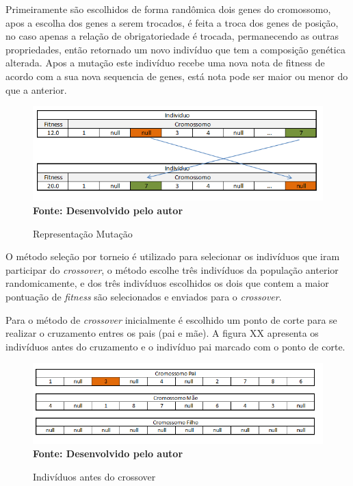 Primeiramente são escolhidos de forma randômica dois genes do cromossomo, apos a escolha dos genes a serem trocados, é feita a troca dos genes de posição, no caso apenas a relação de obrigatoriedade é trocada, permanecendo as outras propriedades, então retornado um novo indivíduo que tem a composição genética alterada. Apos a mutação este indivíduo recebe uma nova nota de fitness de acordo com a sua nova sequencia de genes, está nota pode ser maior ou menor do que a anterior.\par

\begin{figure}[!htb]
\caption[Representação Mutação]{Representação Mutação}
\label{fig:figura8}
\centering
\includegraphics[scale=0.7]{imagens/representacaoMutacao.png}
\\ \textbf{\footnotesize Fonte: Desenvolvido pelo autor}
\end{figure}

O método seleção por torneio é utilizado para selecionar os indivíduos que iram participar do \textit{crossover}, o método escolhe três indivíduos da população anterior randomicamente, e dos três indivíduos escolhidos os dois que contem a maior pontuação de \textit{fitness} são selecionados e enviados para o \textit{crossover}.\par

Para o método de \textit{crossover} inicialmente é escolhido um ponto de corte para se realizar o cruzamento entres os pais (pai e mãe). A figura XX apresenta os indivíduos antes do cruzamento e o indivíduo pai marcado com o ponto de corte.\par

\begin{figure}[!htb]
\caption[Indivíduos antes do crossover]{Indivíduos antes do crossover}
\label{fig:figura8}
\centering
\includegraphics[scale=0.7]{imagens/individuosAntesInsersaoGenetica.png}
\\ \textbf{\footnotesize Fonte: Desenvolvido pelo autor}
\end{figure}

